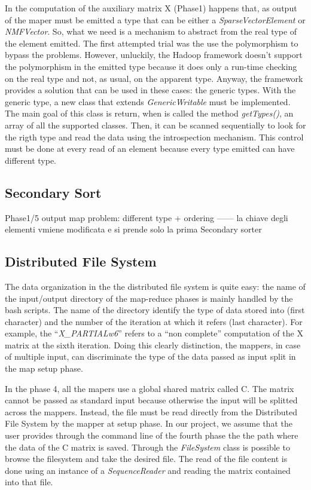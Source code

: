 \documentclass[a4paper,12pt]{article}
\newcommand{\METHOD}[1] {\textit{#1}}
\newcommand{\CLASS}[1] {\textit{#1}}
\begin{document}
In the computation of the auxiliary matrix X (Phase1) happens that, as output of the maper must be emitted a type that can be either a \CLASS{SparseVectorElement} or \CLASS{NMFVector}. So, what we need is a mechanism to abstract from the real type of the element emitted. The first attempted trial was the use the polymorphism to bypass the problems. However, unluckily, the Hadoop framework doesn't support the polymorphism in the emitted type because it does only a run-time checking on the real type and not, as usual, on the apparent type. Anyway, the framework provides a solution that can be used in these cases: the generic types. With the generic type, a new class that extends \CLASS{GenericWritable} must be implemented. The main goal of this class is return, when is called the method \METHOD{getTypes()}, an array of all the supported classes. Then, it can be scanned sequentially to look for the rigth type and read the data using the introspection mechanism. This control must be done at every read of an element because every type emitted can have different type.



\subsection{Secondary Sort}


Phase1/5 output map problem: different type + ordering ------ la chiave degli elementi vmiene modificata e si prende solo la prima
Secondary sorter

\subsection{Distributed File System}

The data organization in the the distributed file system is quite easy: the name of the input/output directory of the map-reduce phases is mainly handled by the bash scripts. The name of the directory identify the type of data stored into (first character)  and the number of the iteration at which it refers (last character). For example, the ``\textit{X\_PARTIALw6}'' refers to a ``non complete'' computation of the X matrix at the sixth iteration. Doing this clearly distinction, the mappers, in case of multiple input, can discriminate the type of the data passed as input split in the map setup phase.

In the phase 4, all the mapers use a global shared matrix called C. The matrix cannot be passed as standard input because otherwise the input will be splitted across the mappers. Instead, the file must be read directly from the Distributed File System by the mapper at setup phase. In our project, we assume that the user provides through the command line of the fourth phase the the path where the data of the C matrix is saved. Through the \CLASS{FileSystem} class is possible to browse the filesystem and take the desired file. The read of the file content is done using an instance of a \CLASS{SequenceReader} and reading the matrix contained into that file.
\end{document}
